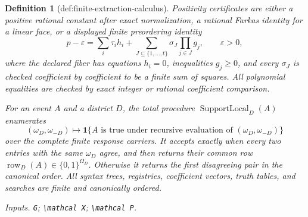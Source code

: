 \documentclass{article}
\newtheorem{definition}{Definition}
\begin{document}
\begin{definition}[def:finite-extraction-calculus]
Positivity certificates are either a positive rational constant after exact normalization, a rational Farkas identity for a linear face, or a displayed finite preordering identity
\[
p-\varepsilon=
\sum_i\tau_i h_i+
\sum_{J\subseteq\{1,\ldots,t\}}\sigma_J
\prod_{j\in J}g_j,
\qquad \varepsilon>0,
\]
where the declared fiber has equations \(h_i=0\), inequalities \(g_j\geq0\), and every \(\sigma_J\) is checked coefficient by coefficient to be a finite sum of squares.  All polynomial equalities are checked by exact integer or rational coefficient comparison.

For an event \(A\) and a district \(D\), the total procedure \(\operatorname{SupportLocal}_D(A)\) enumerates
\[
(\omega_D,\omega_{-D})\longmapsto
\mathbf 1\{A\text{ is true under recursive evaluation of }(\omega_D,\omega_{-D})\}
\]
over the complete finite response carriers.  It accepts exactly when every two entries with the same \(\omega_D\) agree, and then returns their common row \(\operatorname{row}_D(A)\in\{0,1\}^{\Omega_D}\).  Otherwise it returns the first disagreeing pair in the canonical order.  All syntax trees, registries, coefficient vectors, truth tables, and searches are finite and canonically ordered.
\par\smallskip\noindent\emph{Inputs.} \texttt{G}; \texttt{\textbackslash{}\allowbreak{}mathcal X}; \texttt{\textbackslash{}\allowbreak{}mathcal P}.
\end{definition}
\end{document}
